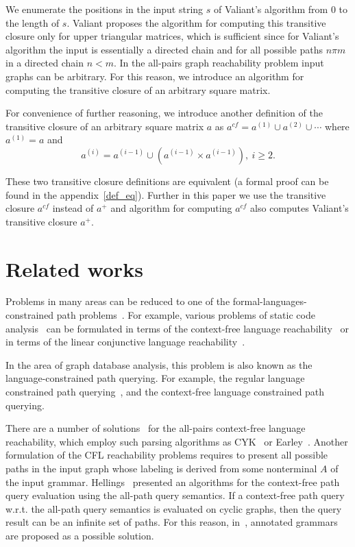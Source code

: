 \documentclass[runningheads,a4paper]{llncs}
\begin{document}
We enumerate the positions in the input string $s$ of Valiant's algorithm from 0 to the length of $s$. Valiant proposes the algorithm for computing this transitive closure only for upper triangular matrices, which is sufficient since for Valiant's algorithm the input is essentially a directed chain and for all possible paths $n \pi m$ in a directed chain $n < m$. In the all-pairs graph reachability problem input graphs can be arbitrary. For this reason, we introduce an algorithm for computing the transitive closure of an arbitrary square matrix.

For convenience of further reasoning, we introduce another definition of the transitive closure of an arbitrary square matrix $a$ as $a^{cf} = a^{(1)} \cup a^{(2)} \cup \cdots$ where $a^{(1)} = a$ and $$a^{(i)} = a^{(i-1)} \cup (a^{(i-1)} \times a^{(i-1)}), ~i \ge 2.$$

These two transitive closure definitions are equivalent (a formal proof can be found in the appendix~\ref{def_eq}). Further in this paper we use the transitive closure $a^{cf}$ instead of $a^+$ and algorithm for computing $a^{cf}$ also computes Valiant's transitive closure $a^+$.

\section{Related works} \label{section_related}%
Problems in many areas can be reduced to one of the formal-languages-constrained path problems~\cite{barrett2000formal}. For example, various problems of static code analysis~\cite{bastani2015specification,xu2009scaling} can be formulated in terms of the context-free language reachability~\cite{reps1998program} or in terms of the linear conjunctive language reachability~\cite{zhang2017context}. 

In the area of graph database analysis, this problem is also known as the language-constrained path querying. For example, the regular language constrained path querying~\cite{reutter2017regular,fan2011adding,abiteboul1997regular,nole2016regular}, and the context-free language constrained path querying.

There are a number of solutions~\cite{hellingsRelational,GraphQueryWithEarley,RDF} for the all-pairs context-free language reachability, which employ such parsing algorithms as CYK~\cite{kasami,younger} or Earley~\cite{Grune}. Another formulation of the CFL reachability problems requires to present all possible paths in the input graph whose labeling is derived from some nonterminal $A$ of the input grammar. Hellings~\cite{hellingsPathQuerying} presented an algorithms for the context-free path query evaluation using the all-path query semantics. If a context-free path query w.r.t. the all-path query semantics is evaluated on cyclic graphs, then the query result can be an infinite set of paths. For this reason, in~\cite{hellingsPathQuerying}, annotated grammars are proposed as a possible solution.
\end{document}
